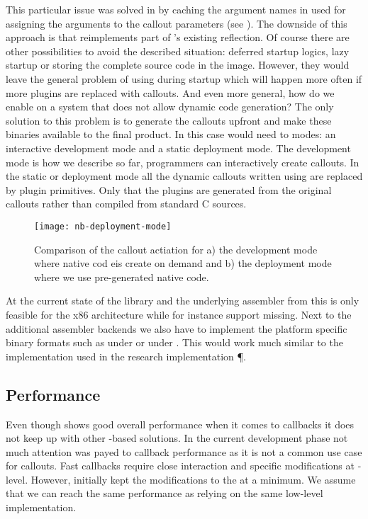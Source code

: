 This particular issue was solved in \PH by caching the argument names in \NB used for assigning the \PH arguments to the callout parameters (see ).
The downside of this approach is that \NB reimplements part of \PH's existing reflection.
Of course there are other possibilities to avoid the described situation: deferred startup logics, lazy startup or storing the complete \PH source code in the image.
However, they would leave the general problem of using \NB during startup which will happen more often if more \VM plugins are replaced with \FFI callouts.
And even more general, how do we enable \NB on a system that does not allow dynamic code generation?
The only solution to this problem is to generate the \FFI callouts upfront and make these binaries available to the final product.
In this case \NB would need to modes: an interactive development mode and a static deployment mode.
The development mode is how we describe \NB so far, programmers can interactively create callouts.
In the static or deployment mode all the dynamic callouts written using \NB are replaced by \PH plugin primitives.
Only that the plugins are generated from the original \NB callouts rather than compiled from standard C sources.
%
\begin{figure}[h]
\centering
\texttt{[image: nb-deployment-mode]}
\caption[\NB Deployment Mode]{Comparison of the callout actiation for a) the development mode where native cod eis create on demand and b) the deployment mode where we use pre-generated native code.}
\end{figure}
%
At the current state of the \FFI library and the underlying assembler from \B this is only feasible for the x86 architecture while for instance \ARM support missing.
Next to the additional assembler backends we also have to implement the platform specific binary formats such as \ELF under \Linux or \MachO under \OSX.
This would work much similar to the implementation used in the research \ST implementation \P \cite{Verw12a}.

\subsection{Performance}
Even though \NB shows good overall performance when it comes to callbacks it does not keep up with other \ST-based solutions.
In the current development phase not much attention was payed to callback performance as it is not a common use case for \FFI callouts.
Fast callbacks require close interaction and specific modifications at \VM-level.
However, initially \NB kept the modifications to the \VM at a minimum.
We assume that we can reach the same performance as \Alien relying on the same low-level implementation.

